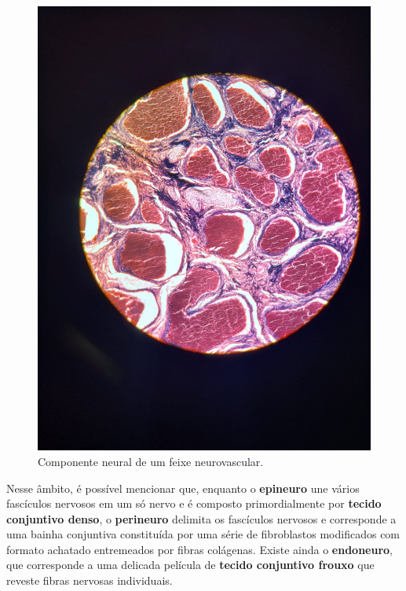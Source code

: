 \documentclass[
]{book}
\begin{document}
\begin{figure}
\centering
\includegraphics{images/neuro-feixevascner.jpeg}
\caption{\label{fig:unnamed-chunk-10}Componente neural de um feixe neurovascular.}
\end{figure}

Nesse âmbito, é possível mencionar que, enquanto o \textbf{epineuro} une vários fascículos nervosos em um só nervo e é composto primordialmente por \textbf{tecido conjuntivo denso}, o \textbf{perineuro} delimita os fascículos nervosos e corresponde a uma bainha conjuntiva constituída por uma série de fibroblastos modificados com formato achatado entremeados por fibras colágenas. Existe ainda o \textbf{endoneuro}, que corresponde a uma delicada película de \textbf{tecido conjuntivo frouxo} que reveste fibras nervosas individuais.
\end{document}
